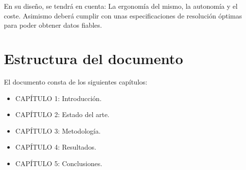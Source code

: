 En su diseño, se tendrá en cuenta: La ergonomía del mismo, la autonomía y el coste. Asimismo deberá cumplir con unas especificaciones de resolución óptimas para poder obtener datos fiables.


\section{Estructura del documento}

El documento consta de los siguientes capítulos: 

\begin{itemize}
	\item {CAPÍTULO 1: Introducción.}
	\item {CAPÍTULO 2: Estado del arte.}
	\item {CAPÍTULO 3: Metodología.}
	\item {CAPÍTULO 4: Resultados.}
	\item {CAPÍTULO 5: Conclusiones.}
\end{itemize}


